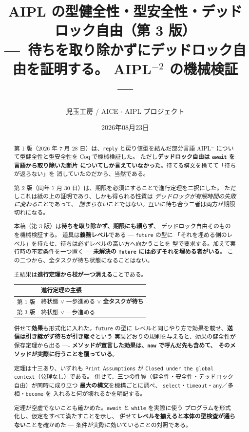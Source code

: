 \documentclass[11pt,a4paper]{ltjsarticle}
\title{AIPL の型健全性・型安全性・デッドロック自由（第 3 版）\\
{\large ---\ 待ちを取り除かずにデッドロック自由を証明する。
AIPL$^{-2}$ の機械検証 ---}}
\author{児玉工房 / AICE $\cdot$ AIPL プロジェクト}
\date{2026年08月23日}
\theoremstyle{definition}
\theoremstyle{remark}
\begin{document}
\maketitle

\begin{abstract}
第 1 版（2026 年 7 月 28 日）は、\texttt{reply} と戻り値型を結んだ部分言語
AIPL$^-$ について型健全性と型安全性を Coq で機械検証した。
ただし\textbf{デッドロック自由は \texttt{await} を言語から取り除いた断片
についてしか言えていなかった}。待てる構文を捨てて「待ちが返らない」を
消していたのだから、当然である。

第 2 版（同年 7 月 30 日）は、期限を必須にすることで進行定理を二択にした。
ただしこれは紙の上の証明であり、しかも得られる性質は
\emph{デッドロックが有限時間の失敗に変わる}ことであって、
\emph{詰まらない}ことではない。互いに待ち合う二者は両方が期限切れになる。

本稿（第 3 版）は\textbf{待ちを取り除かず、期限にも頼らず}、
デッドロック自由そのものを機械検証する。
道具は\textbf{義務レベル}である --- \texttt{future} の型に
「それを埋める側のレベル」を持たせ、待ちは必ずレベルの高い方へ向かうことを
型で要求する。加えて実行時の不変条件を一つ置く ---
\textbf{未解決の \texttt{future} には必ずそれを埋める者がいる}。
この二つから、全タスクが待ち状態になることはない。

主結果は\textbf{進行定理から枝が一つ消える}ことである。

\begin{center}
\begin{tabular}{ll}
\toprule
& 進行定理の主張 \\
\midrule
第 1 版 & 終状態 $\lor$ 一歩進める $\lor$ \textbf{全タスクが待ち} \\
第 3 版 & 終状態 $\lor$ 一歩進める \\
\bottomrule
\end{tabular}
\end{center}

併せて\textbf{効果}も形式化に入れた。\texttt{future} の型に
レベルと同じやり方で効果を載せ、\textbf{送信は引き継がず待ちが引き継ぐ}という
実装どおりの規則を与えると、効果の健全性が保存定理から出る ----
\textbf{メソッドが宣言した効果は、\texttt{now} で呼んだ先も含めて、
そのメソッドが実際に行うことを覆っている}。

定理は十三あり、いずれも \texttt{Print Assumptions} が
\texttt{Closed under the global context}（公理なし）である。
併せて、三つの性質（健全性・安全性・デッドロック自由）が同時に成り立つ
\textbf{最大の構文}を機構ごとに調べ、
\texttt{select}・\texttt{timeout}・\texttt{any}／多相・\texttt{become} を
入れると何が壊れるかを明記する。

定理が空虚でないことも確かめた。\texttt{await} と \texttt{while} を実際に使う
プログラムを形式化し、仮定をすべて満たすことを示し、
併せて\textbf{レベルを揃えると本体の型検査が通らない}ことを確かめた ---
条件が実際に効いていることの対照である。
\end{abstract}
\end{document}
